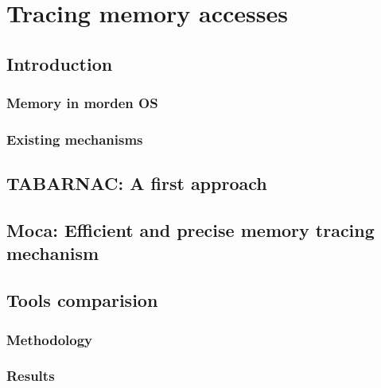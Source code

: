 \chapter{Tracing memory accesses}

\section{Introduction}

\subsection{Memory in morden OS}


\subsection{Existing mechanisms}


\section{TABARNAC: A first approach}


\section{Moca: Efficient and precise memory tracing mechanism}


\section{Tools comparision}


\subsection{Methodology}


\subsection{Results}


